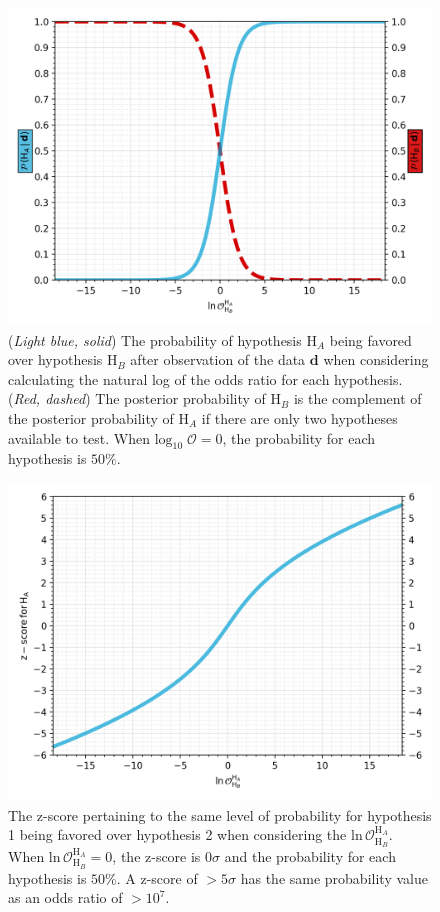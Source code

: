\newpage
\begin{figure}[th]
  \includegraphics[width=\textwidth]{figs/chapter5/log_odds_probability.png}
  \caption{(\textit{Light blue, solid}) The probability of hypothesis $\mathrm{H}_A$ being favored over hypothesis $\mathrm{H}_B$ after observation of the data $\mathbf{d}$ when considering calculating the natural log of the odds ratio for each hypothesis. (\textit{Red, dashed}) The posterior probability of $\mathrm{H}_B$ is the complement of the posterior probability of $\mathrm{H}_A$ if there are only two hypotheses available to test. When $\mathrm{log}_{10} \; \mathcal{O} = 0$, the probability for each hypothesis is $50\%$.}
  \label{fig:log_odds_v_probability}
\end{figure}

\begin{figure}[th]
  \includegraphics[width=\textwidth]{figs/chapter5/log_odds_z_score.png}
  \caption{The z-score pertaining to the same level of probability for  hypothesis 1 being favored over hypothesis 2 when considering the $\mathrm{ln} \, \mathcal{O}^{\mathrm{H}_A}_{\mathrm{H}_B}$. When $\mathrm{ln} \, \mathcal{O}^{\mathrm{H}_A}_{\mathrm{H}_B} = 0$, the z-score is $0 \sigma$ and the probability for each hypothesis is $50\%$. A z-score of $>5 \sigma$ has the same probability value as an odds ratio of $> 10^7$.}
  \label{fig:log_odds_v_z_score}
\end{figure}

